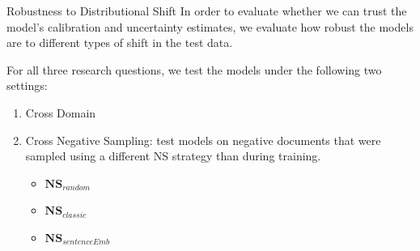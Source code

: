 \documentclass{beamer}
\begin{document}
\begin{frame}{Robustness to Distributional Shift}
In order to evaluate whether we can trust the model’s calibration and uncertainty estimates, we evaluate how robust the models are to different types of shift in the test data.

For all three research questions, we test the models under the following two settings:
\begin{enumerate}
    \item Cross Domain
    \item Cross Negative Sampling: test models on negative documents that were sampled using a different NS strategy than during training.
        \begin{itemize}
            \item $\textbf{NS}_{random}$
            \item $\textbf{NS}_{classic}$
            \item $\textbf{NS}_{sentenceEmb}$
        \end{itemize}
        
\end{enumerate}
    
\end{frame}
\end{document}
